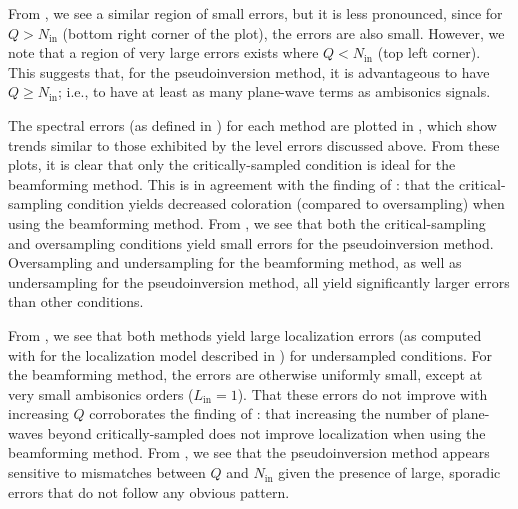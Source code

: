 From , we see a similar region of small errors, but it is less pronounced, since for $Q > N_\text{in}$ (bottom right corner of the plot), the errors are also small.
However, we note that a region of very large errors exists where $Q < N_\text{in}$ (top left corner).
This suggests that, for the pseudoinversion method, it is advantageous to have $Q \geq N_\text{in}$;
i.e., to have at least as many plane-wave terms as ambisonics signals.

The spectral errors (as defined in ) for each method are plotted in , which show trends similar to those exhibited by the level errors discussed above.
From these plots, it is clear that only the critically-sampled condition is ideal for the beamforming method.
This is in agreement with the finding of \citet[cf.~Fig.~7]{HahnSpors2015b}: that the critical-sampling condition yields decreased coloration (compared to oversampling) when using the beamforming method.
From , we see that both the critical-sampling and oversampling conditions yield small errors for the pseudoinversion method.
Oversampling and undersampling for the beamforming method, as well as undersampling for the pseudoinversion method, all yield significantly larger errors than other conditions.

From , we see that both methods yield large localization errors (as computed with  for the localization model described in ) for undersampled conditions.
For the beamforming method, the errors are otherwise uniformly small, except at very small ambisonics orders ($L_\text{in} = 1$).
That these errors do not improve with increasing $Q$ corroborates the finding of \citet[cf.~Fig.~4]{Winter2014}: that increasing the number of plane-waves beyond critically-sampled does not improve localization when using the beamforming method.
From , we see that the pseudoinversion method appears sensitive to mismatches between $Q$ and $N_\text{in}$ given the presence of large, sporadic errors that do not follow any obvious pattern.

